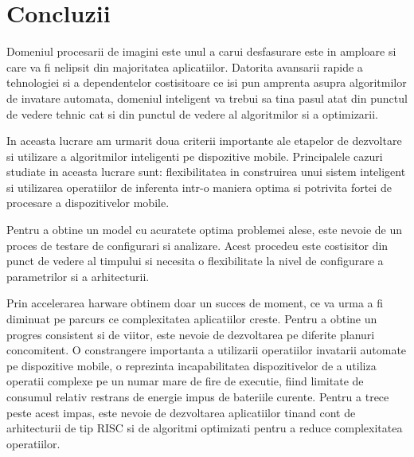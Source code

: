\chapter{Concluzii}

Domeniul procesarii de imagini este unul a carui desfasurare este in amploare si care va fi nelipsit din majoritatea aplicatiilor. Datorita avansarii rapide a tehnologiei si a dependentelor costisitoare ce isi pun amprenta asupra algoritmilor de invatare automata, domeniul inteligent va trebui sa tina pasul atat din punctul de vedere tehnic cat si din punctul de vedere al algoritmilor si a optimizarii. \newline

In aceasta lucrare am urmarit doua criterii importante ale etapelor de dezvoltare si utilizare a algoritmilor inteligenti pe dispozitive mobile. Principalele cazuri studiate in aceasta lucrare sunt: flexibilitatea in construirea unui sistem inteligent si utilizarea operatiilor de inferenta intr-o maniera optima si potrivita fortei de procesare a dispozitivelor mobile.\newline

Pentru a obtine un model cu acuratete optima problemei alese, este nevoie de un proces de testare de configurari si analizare. Acest procedeu este costisitor din punct de vedere al timpului si necesita o flexibilitate la nivel de configurare a parametrilor si a arhitecturii.\newline

Prin accelerarea harware obtinem doar un succes de moment, ce va urma a fi diminuat pe parcurs ce complexitatea aplicatiilor creste. Pentru a obtine un progres consistent si de viitor, este nevoie de dezvoltarea pe diferite planuri concomitent. O constrangere importanta a utilizarii operatiilor invatarii automate pe dispozitive mobile, o reprezinta incapabilitatea dispozitivelor de a utiliza operatii complexe pe un numar mare de fire de executie, fiind limitate de consumul relativ restrans de energie impus de bateriile curente. Pentru a trece peste acest impas, este nevoie de dezvoltarea aplicatiilor tinand cont de arhitecturii de tip RISC si de algoritmi optimizati pentru a reduce complexitatea operatiilor.

